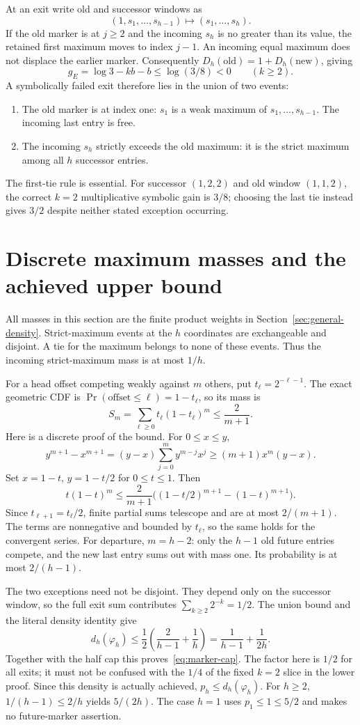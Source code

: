 \documentclass[11pt,letterpaper]{article}
\begin{document}
At an exit write old and successor windows as
\[
 (1,s_1,\ldots,s_{h-1})\longmapsto(s_1,\ldots,s_h).
\]
If the old marker is at $j\ge2$ and the incoming $s_h$ is no greater than
its value, the retained first maximum moves to index $j-1$. An incoming
equal maximum does not displace the earlier marker. Consequently
$D_h(\mathrm{old})=1+D_h(\mathrm{new})$, giving
\[
 g_E=\log3-kb-b\le\log(3/8)<0\qquad(k\ge2).
\]
A symbolically failed exit therefore lies in the union of two events:
\begin{enumerate}[nosep]
\item The old marker is at index one: $s_1$ is a weak maximum of
$s_1,\ldots,s_{h-1}$. The incoming last entry is free.
\item The incoming $s_h$ strictly exceeds the old maximum: it is the strict
maximum among all $h$ successor entries.
\end{enumerate}
The first-tie rule is essential. For successor $(1,2,2)$ and old window
$(1,1,2)$, the correct $k=2$ multiplicative symbolic gain is $3/8$; choosing
the last tie instead gives $3/2$ despite neither stated exception occurring.

\section{Discrete maximum masses and the achieved upper bound}
All masses in this section are the finite product weights in
Section~\ref{sec:general-density}. Strict-maximum events at the $h$ coordinates
are exchangeable and disjoint. A tie for the maximum belongs to none of
these events. Thus the incoming strict-maximum mass is at most $1/h$.

For a head offset competing weakly against $m$ others, put
$t_\ell=2^{-\ell-1}$. The exact geometric CDF is
$\Pr(\mathrm{offset}\le\ell)=1-t_\ell$, so its mass is
\[
 S_m=\sum_{\ell\ge0}t_\ell(1-t_\ell)^m\le\frac2{m+1}.
\]
Here is a discrete proof of the bound. For $0\le x\le y$,
\[
 y^{m+1}-x^{m+1}
 =(y-x)\sum_{j=0}^{m}y^{m-j}x^j\ge(m+1)x^m(y-x).
\]
Set $x=1-t$, $y=1-t/2$ for $0\le t\le1$. Then
\[
 t(1-t)^m\le\frac2{m+1}
 \big((1-t/2)^{m+1}-(1-t)^{m+1}\big).
\]
Since $t_{\ell+1}=t_\ell/2$, finite partial sums telescope and are at most
$2/(m+1)$. The terms are nonnegative and bounded by $t_\ell$, so the same
holds for the convergent series. For departure, $m=h-2$: only the $h-1$
old future entries compete, and the new last entry sums out with mass one.
Its probability is at most $2/(h-1)$.

The two exceptions need not be disjoint. They depend only on the successor
window, so the full exit sum contributes
$\sum_{k\ge2}2^{-k}=1/2$. The union bound and the literal density identity give
\[
 d_h(\varphi_h)\le\frac12\left(\frac2{h-1}+\frac1h\right)
 =\frac1{h-1}+\frac1{2h}.
\]
Together with the half cap this proves~\eqref{eq:marker-cap}. The factor here
is $1/2$ for all exits; it must not be confused with the $1/4$ of the fixed
$k=2$ slice in the lower proof. Since this density is actually achieved,
$p_h\le d_h(\varphi_h)$. For $h\ge2$, $1/(h-1)\le2/h$ yields $5/(2h)$.
The case $h=1$ uses $p_1\le1\le5/2$ and makes no future-marker assertion.
\end{document}
